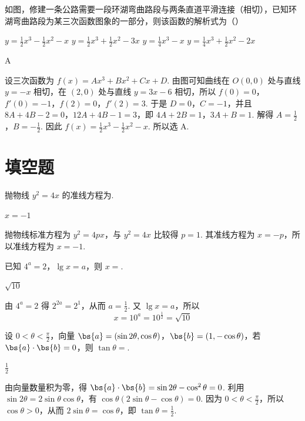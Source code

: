 \begin{problem}
如图，修建一条公路需要一段环湖弯曲路段与两条直道平滑连接（相切），已知环湖弯曲路段为某三次函数图象的一部分，则该函数的解析式为（\quad）


\choices
    {\( y = \frac{1}{2} x^3 - \frac{1}{2} x^2 - x \)}
    {\( y = \frac{1}{2} x^3 + \frac{1}{2} x^2 - 3x \)}
    {\( y = \frac{1}{4} x^3 - x \)}
    {\( y = \frac{1}{4} x^3 + \frac{1}{2} x^2 - 2x \)}
\begin{answer}
A
\end{answer}
\begin{solution}
设三次函数为 \(f(x)=Ax^3+Bx^2+Cx+D\). 由图可知曲线在 \(O(0,0)\) 处与直线 \(y=-x\) 相切，在 \((2,0)\) 处与直线 \(y=3x-6\) 相切，所以 \(f(0)=0\)，\(f'(0)=-1\)，\(f(2)=0\)，\(f'(2)=3\).
于是 \(D=0\)，\(C=-1\)，并且 \(8A+4B-2=0\)，\(12A+4B-1=3\)，即 \(4A+2B=1\)，\(3A+B=1\). 解得 \(A=\frac12\)，\(B=-\frac12\). 因此 \(f(x)=\frac12x^3-\frac12x^2-x\).
所以选 A.
\end{solution}
\end{problem}

\section{填空题}

\begin{problem}
抛物线 \( y^{2}=4x \) 的准线方程为\fillinblank{}.
\begin{answer}
\(x=-1\)
\end{answer}
\begin{solution}
抛物线标准方程为 \(y^2=4px\)，与 \(y^2=4x\) 比较得 \(p=1\). 其准线方程为 \(x=-p\)，所以准线方程为 \(x=-1\).
\end{solution}
\end{problem}

\begin{problem}
已知 \( 4^{a}=2 \)，\( \lg x=a \)，则 \(x=\)\fillinblank{}.
\begin{answer}
\(\sqrt{10}\)
\end{answer}
\begin{solution}
由 \(4^a=2\) 得 \(2^{2a}=2^1\)，从而 \(a=\frac12\). 又 \(\lg x=a\)，所以
\[
x=10^a=10^{\frac{1}{2}}=\sqrt{10}
\]
\end{solution}
\end{problem}

\begin{problem}
设 \(0 < \theta < \frac{\pi}{2}\)，向量 \(\bs{a} = (\sin 2\theta, \cos \theta)\)，\(\bs{b} = (1, -\cos \theta)\)，若 \(\bs{a} \cdot \bs{b} = 0\)，则 \(\tan \theta =\)\fillinblank{}.
\begin{answer}
\(\frac{1}{2}\)
\end{answer}
\begin{solution}
由向量数量积为零，得 \(\bs{a}\cdot\bs{b}=\sin 2\theta-\cos^2\theta=0\). 利用 \(\sin 2\theta=2\sin\theta\cos\theta\)，有 \(\cos\theta(2\sin\theta-\cos\theta)=0\). 因为 \(0<\theta<\frac\pi2\)，所以 \(\cos\theta>0\)，从而 \(2\sin\theta=\cos\theta\)，即 \(\tan\theta=\frac12\).
\end{solution}
\end{problem}

